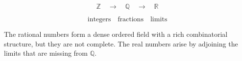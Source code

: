 \medskip

\begin{remark}

\[
\mathbb{Z}
\quad\longrightarrow\quad
\mathbb{Q}
\quad\longrightarrow\quad
\mathbb{R}
\]

\[
\text{integers}
\quad
\text{fractions}
\quad
\text{limits}
\]

The rational numbers form a dense ordered field with a rich
combinatorial structure, but they are not complete.  The real numbers
arise by adjoining the limits that are missing from $\mathbb{Q}$.

\end{remark}